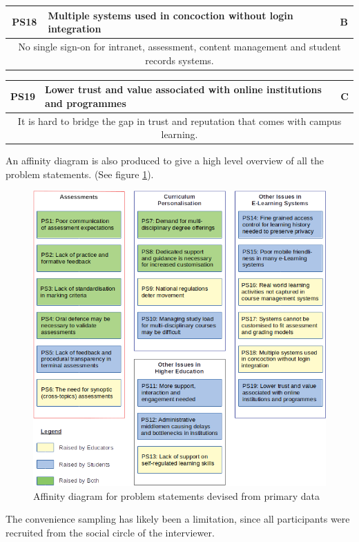 \begin{table}[!ht]
	\begin{tabularx}{\textwidth}{|c|X|c|}
		\hline
		PS18 & \textbf{Multiple systems used in concoction without login integration} & B                                 \\
		\hline
		\multicolumn{3}{|X|}{No single sign-on for intranet, assessment, content management and student records systems.} \\
		\hline
	\end{tabularx}
\end{table}
\begin{table}[!ht]
	\begin{tabularx}{\textwidth}{|c|X|c|}
		\hline
		PS19 & \textbf{Lower trust and value associated with online institutions and programmes} & C                \\
		\hline
		\multicolumn{3}{|X|}{It is hard to bridge the gap in trust and reputation that comes with campus learning.} \\
		\hline
	\end{tabularx}
\end{table}

An affinity diagram is also produced to give a high level overview of all the problem statements.
(See figure \ref{fig:ps-affinity}).
\begin{figure}[!ht]
	\centering
	\includegraphics[width=1.0\textwidth]{ps-affinity}
	\caption[Affinity diagram for primary data]
	{Affinity diagram for problem statements devised from primary data}
	\label{fig:ps-affinity}
\end{figure}
The convenience sampling has likely been a limitation, since all participants were 
recruited from the social circle of the interviewer.

